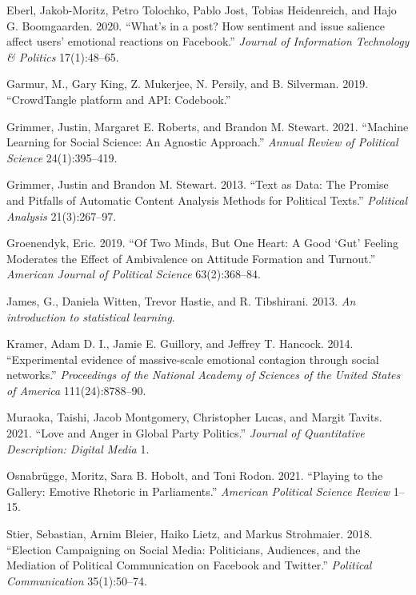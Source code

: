 \documentclass[
  12pt,
]{article}
\begin{document}
\leavevmode\hypertarget{ref-eberl2020what}{}%
Eberl, Jakob-Moritz, Petro Tolochko, Pablo Jost, Tobias Heidenreich, and Hajo G. Boomgaarden. 2020. ``What's in a post? How sentiment and issue salience affect users' emotional reactions on Facebook.'' \emph{Journal of Information Technology \& Politics} 17(1):48--65.

\leavevmode\hypertarget{ref-garmur2019crowdtangle}{}%
Garmur, M., Gary King, Z. Mukerjee, N. Persily, and B. Silverman. 2019. ``CrowdTangle platform and API: Codebook.''

\leavevmode\hypertarget{ref-grimmer2021machine}{}%
Grimmer, Justin, Margaret E. Roberts, and Brandon M. Stewart. 2021. ``Machine Learning for Social Science: An Agnostic Approach.'' \emph{Annual Review of Political Science} 24(1):395--419.

\leavevmode\hypertarget{ref-grimmer2013text}{}%
Grimmer, Justin and Brandon M. Stewart. 2013. ``Text as Data: The Promise and Pitfalls of Automatic Content Analysis Methods for Political Texts.'' \emph{Political Analysis} 21(3):267--97.

\leavevmode\hypertarget{ref-groenendyk2019two}{}%
Groenendyk, Eric. 2019. ``Of Two Minds, But One Heart: A Good `Gut' Feeling Moderates the Effect of Ambivalence on Attitude Formation and Turnout.'' \emph{American Journal of Political Science} 63(2):368--84.

\leavevmode\hypertarget{ref-james2013introduction}{}%
James, G., Daniela Witten, Trevor Hastie, and R. Tibshirani. 2013. \emph{An introduction to statistical learning}.

\leavevmode\hypertarget{ref-kramer2014experimental}{}%
Kramer, Adam D. I., Jamie E. Guillory, and Jeffrey T. Hancock. 2014. ``Experimental evidence of massive-scale emotional contagion through social networks.'' \emph{Proceedings of the National Academy of Sciences of the United States of America} 111(24):8788--90.

\leavevmode\hypertarget{ref-muraoka2021love}{}%
Muraoka, Taishi, Jacob Montgomery, Christopher Lucas, and Margit Tavits. 2021. ``Love and Anger in Global Party Politics.'' \emph{Journal of Quantitative Description: Digital Media} 1.

\leavevmode\hypertarget{ref-osnabrugge2021playing}{}%
Osnabrügge, Moritz, Sara B. Hobolt, and Toni Rodon. 2021. ``Playing to the Gallery: Emotive Rhetoric in Parliaments.'' \emph{American Political Science Review} 1--15.

\leavevmode\hypertarget{ref-stier2018election}{}%
Stier, Sebastian, Arnim Bleier, Haiko Lietz, and Markus Strohmaier. 2018. ``Election Campaigning on Social Media: Politicians, Audiences, and the Mediation of Political Communication on Facebook and Twitter.'' \emph{Political Communication} 35(1):50--74.
\end{document}
